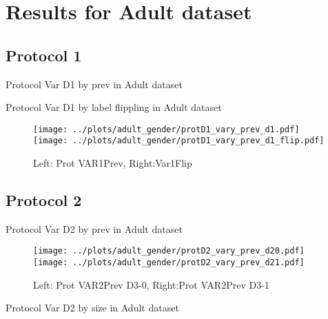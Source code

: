 \documentclass[10pt,a4paper]{article}
\begin{document}
\section{Results for Adult dataset}

\subsection{Protocol 1}

\begin{table}[h!]

\caption{Protocol Var D1 by prev in Adult dataset}
\end{table}

\begin{table}[h!]

\caption{Protocol Var D1 by label flippling in Adult dataset}
\end{table}

\begin{figure}[h!]
\texttt{[image: ../plots/adult\_gender/protD1\_vary\_prev\_d1.pdf]}
\texttt{[image: ../plots/adult\_gender/protD1\_vary\_prev\_d1\_flip.pdf]}
\caption{Left: Prot VAR1Prev, Right:Var1Flip}
\end{figure}

\clearpage
\newpage
\subsection{Protocol 2}

\begin{table}[h!]

\caption{Protocol Var D2 by prev in Adult dataset}
\end{table}

\begin{figure}[h!]
\texttt{[image: ../plots/adult\_gender/protD2\_vary\_prev\_d20.pdf]}
\texttt{[image: ../plots/adult\_gender/protD2\_vary\_prev\_d21.pdf]}
\caption{Left: Prot VAR2Prev D3-0, Right:Prot VAR2Prev D3-1}
\end{figure}

\begin{table}[h!]

\caption{Protocol Var D2 by size in Adult dataset}
\end{table}
\end{document}
